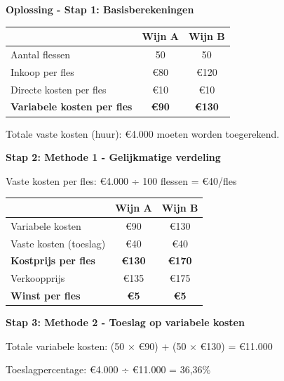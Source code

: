 \documentclass[a4paper,11pt]{article}
\begin{document}
\begin{description}
\begin{oefenblok}
              \textbf{Oplossing - Stap 1: Basisberekeningen}

              \begin{tabular}{lcc}
                  \hline
                                                     & \textbf{Wijn A} & \textbf{Wijn B} \\
                  \hline
                  Aantal flessen                     & 50              & 50              \\
                  Inkoop per fles                    & €80             & €120            \\
                  Directe kosten per fles            & €10             & €10             \\
                  \textbf{Variabele kosten per fles} & \textbf{€90}    & \textbf{€130}   \\
                  \hline
              \end{tabular}

              Totale vaste kosten (huur): €4.000 moeten worden toegerekend.

              \textbf{Stap 2: Methode 1 - Gelijkmatige verdeling}

              Vaste kosten per fles: €4.000 ÷ 100 flessen = €40/fles

              \begin{tabular}{lcc}
                  \hline
                                              & \textbf{Wijn A} & \textbf{Wijn B} \\
                  \hline
                  Variabele kosten            & €90             & €130            \\
                  Vaste kosten (toeslag)      & €40             & €40             \\
                  \textbf{Kostprijs per fles} & \textbf{€130}   & \textbf{€170}   \\
                  Verkoopprijs                & €135            & €175            \\
                  \textbf{Winst per fles}     & \textbf{€5}     & \textbf{€5}     \\
                  \hline
              \end{tabular}

              \textbf{Stap 3: Methode 2 - Toeslag op variabele kosten}

              Totale variabele kosten: (50 × €90) + (50 × €130) = €11.000

              Toeslagpercentage: €4.000 ÷ €11.000 = 36,36\%


\end{oefenblok}
\end{description}
\end{document}
